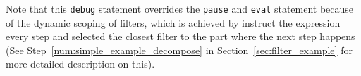 Note that this \verb|debug| statement overrides the \verb|pause| and
\verb|eval| statement because of the dynamic scoping of filters, which
is achieved by instruct the expression every step and selected the
closest filter to the part where the next step happens (See
Step~\ref{num:simple_example_decompose} in
Section~\ref{sec:filter_example} for more detailed description on
this).









